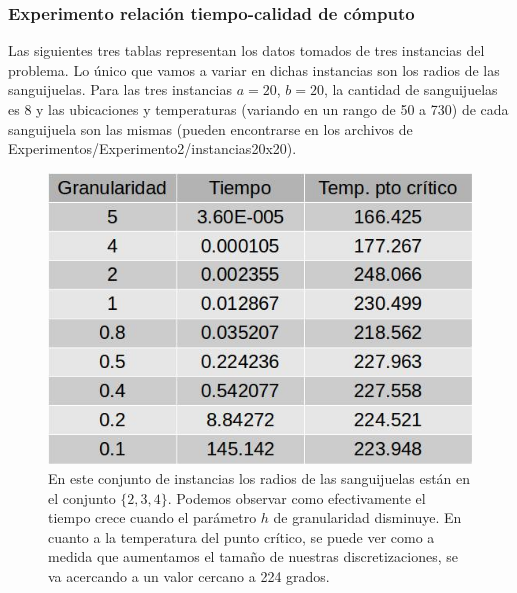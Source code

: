 \subsubsection{Experimento relación tiempo-calidad de cómputo}
Las siguientes tres tablas representan los datos tomados de tres instancias del problema. Lo único que vamos a variar en dichas instancias son los radios de las sanguijuelas. Para las tres instancias $a = 20$, $b = 20$, la cantidad de sanguijuelas es 8 y las ubicaciones y temperaturas (variando en un rango de 50 a 730) de cada sanguijuela son las mismas (pueden encontrarse en los archivos de Experimentos/Experimento2/instancias20x20).
\newline
\begin{figure}[H]
\centering
\includegraphics[scale=0.4]{instancia20x20_1.jpg}\caption{En este conjunto de instancias los radios de las sanguijuelas están en el conjunto $\{2, 3, 4\}$. Podemos observar como efectivamente el tiempo crece cuando el parámetro $h$ de granularidad disminuye. En cuanto a la temperatura del punto crítico, se puede ver como a medida que aumentamos el tamaño de nuestras discretizaciones, se va acercando a un valor cercano a 224 grados.}
\end{figure}

